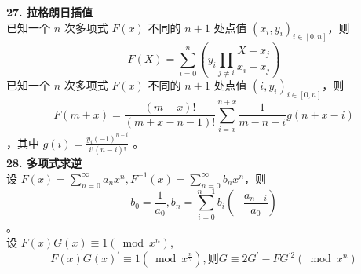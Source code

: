 \textbf{27. 拉格朗日插值} \\
已知一个 $n$ 次多项式 $F(x)$ 不同的 $n+1$ 处点值 $(x_i,y_i)_{i\in[0,n]}$，则 $$F(X)=\sum_{i=0}^{n}\left(y_{i}\prod_{j\neq i}\frac{X-x_{j}}{x_{i}-x_{j}}\right)$$
已知一个 $n$ 次多项式 $F(x)$ 不同的 $n+1$ 处点值 $(i,y_i)_{i\in[0,n]}$，则 $$F(m+x)=\frac{(m+x)!}{(m+x-n-1)!}\sum_{i=x}^{n+x}\frac{1}{m-n+i}g(n+x-i)$$，其中 $g(i)=\frac{y_i(-1)^{n-i}}{i!(n-i)!}$ 。 \\
\textbf{28. 多项式求逆}\\
设 $F(x)=\sum_{n=0}^{\infty}a_nx^n, F^{-1}(x)=\sum_{n=0}^{\infty}b_nx^n$，则 $$b_0=\frac{1}{a_0},b_n=\sum_{i=0}^{n-1}b_i\left(-\frac{a_{n-i}}{a_0}\right)$$ 。\\
设 $F(x)G(x)\equiv 1(\bmod x^{n})$,$$F(x)G(x)^{\prime}\equiv 1(\bmod x^{\frac{n}{2}}), 则 G\equiv 2G^{\prime}-FG^{\prime 2}(\bmod x^{n})$$
